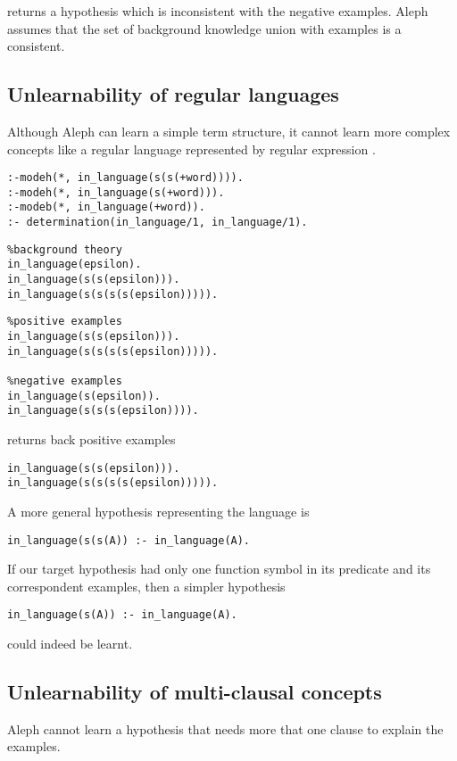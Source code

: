 returns a hypothesis  which is inconsistent with the negative examples. Aleph assumes that the set of background knowledge union with examples is a consistent.

\subsection{Unlearnability of regular languages}
Although Aleph can learn a simple term structure, it cannot learn more complex concepts like a regular language represented by regular expression .

\begin{lstlisting}
:-modeh(*, in_language(s(s(+word)))).
:-modeh(*, in_language(s(+word))).
:-modeb(*, in_language(+word)).
:- determination(in_language/1, in_language/1).
\end{lstlisting}

\begin{minipage}[t]{.50\textwidth}
\begin{lstlisting}
%background theory
in_language(epsilon).
in_language(s(s(epsilon))).
in_language(s(s(s(s(epsilon))))).
\end{lstlisting}
\end{minipage}
\begin{minipage}[t]{.20\textwidth}
\begin{lstlisting}
%positive examples
in_language(s(s(epsilon))).
in_language(s(s(s(s(epsilon))))).

%negative examples
in_language(s(epsilon)).
in_language(s(s(s(epsilon)))).
\end{lstlisting}
\end{minipage}

returns back positive examples
\begin{lstlisting}
in_language(s(s(epsilon))).
in_language(s(s(s(s(epsilon))))).
\end{lstlisting}
A more general hypothesis representing the language is
\begin{lstlisting}
in_language(s(s(A)) :- in_language(A).
\end{lstlisting}
If our target hypothesis had only one function symbol in its predicate and its correspondent examples, then a simpler hypothesis
\begin{lstlisting}
in_language(s(A)) :- in_language(A).
\end{lstlisting}
could indeed be learnt.

\subsection{Unlearnability of multi-clausal concepts}
Aleph cannot learn a hypothesis that needs more that one clause to explain the examples.

